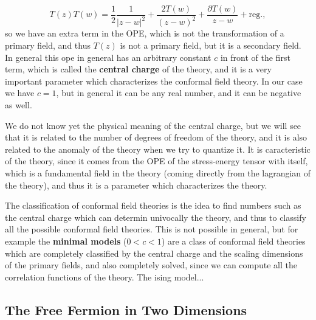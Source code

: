 \[
    T(z)T(w) = \frac{1}{2} \frac{1}{\vert z-w \vert^2} + \frac{2 T(w)}{(z-w)^2} + \frac{\partial T(w)}{z-w} + \text{reg.},
\]
so we have an extra term in the OPE, which is not the transformation of a primary field, and thus \(T(z)\) is not a primary field, but it is a secondary field.
In general this ope in general has an arbitrary constant \(c\) in front of the first term, which is called the \textbf{central charge} of the theory, and it is a very important parameter which characterizes the conformal field theory. In our case we have \(c=1\), but in general it can be any real number, and it can be negative as well.

We do not know yet the physical meaning of the central charge, but we will see that it is related to the number of degrees of freedom of the theory, and it is also related to the anomaly of the theory when we try to quantize it. It is caracteristic of the theory, since it comes from the OPE of the stress-energy tensor with itself, which is a fundamental field in the theory (coming directly from the lagrangian of the theory), and thus it is a parameter which characterizes the theory.

The classification of conformal field theories is the idea to find numbers such as the central charge which can determin univocally the theory, and thus to classify all the possible conformal field theories. This is not possible in general, but for example the \textbf{minimal models} (\(0<c<1\)) are a class of conformal field theories which are completely classified by the central charge and the scaling dimensions of the primary fields, and also completely solved, since we can compute all the correlation functions of the theory. The ising model...

\subsection{The Free Fermion in Two Dimensions}